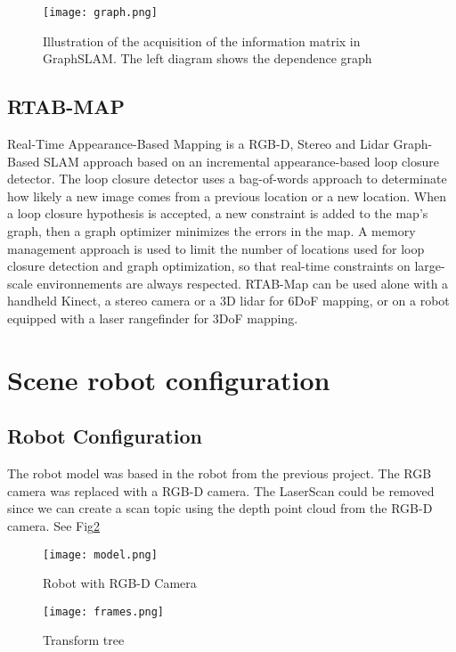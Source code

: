 \documentclass[10pt,journal,compsoc]{IEEEtran}
\begin{document}
\begin{figure}[thpb]
      \centering
      \texttt{[image: graph.png]}
      \caption{Illustration of the acquisition of the information matrix in GraphSLAM. The left diagram shows the
      dependence graph \cite{Thrun2006a}}
      \label{fig:graph}
\end{figure}

\subsection{RTAB-MAP}

Real-Time Appearance-Based Mapping is a RGB-D, Stereo and Lidar Graph-Based SLAM approach based on an incremental appearance-based loop closure detector. The loop closure detector uses a bag-of-words approach to determinate how likely a new image comes from a previous location or a new location. When a loop closure hypothesis is accepted, a new constraint is added to the map’s graph, then a graph optimizer minimizes the errors in the map. A memory management approach is used to limit the number of locations used for loop closure detection and graph optimization, so that real-time constraints on large-scale environnements are always respected. RTAB-Map can be used alone with a handheld Kinect, a stereo camera or a 3D lidar for 6DoF mapping, or on a robot equipped with a laser rangefinder for 3DoF mapping.

\section{Scene robot configuration}
\subsection{Robot Configuration}


The robot model was based in the robot from the previous project. The RGB camera was replaced with a RGB-D camera. The
LaserScan could be removed since we can create a scan topic using the depth point cloud from the RGB-D camera. See
Fig\ref{fig:rgbd}

\begin{figure}[thpb]
      \centering
      \texttt{[image: model.png]}
      \caption{Robot with RGB-D Camera}
      \label{fig:rgbd}
\end{figure}

\begin{figure}[thpb]
      \centering
      \texttt{[image: frames.png]}
      \caption{Transform tree}
      \label{fig:tree}
\end{figure}
\end{document}
